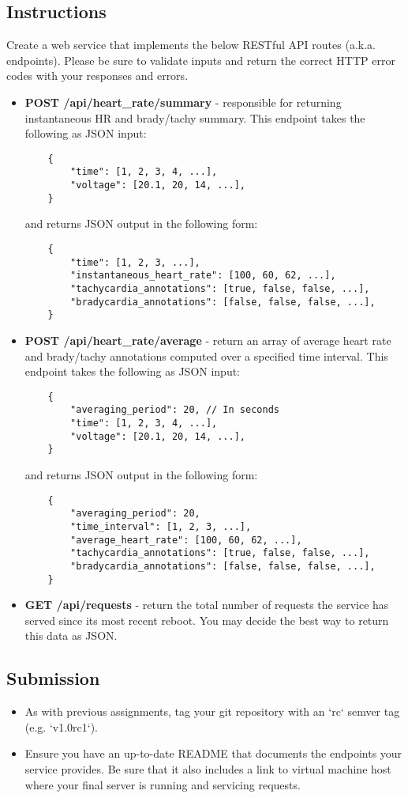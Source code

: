 \subsection*{Instructions}
Create a web service that implements the below RESTful API routes (a.k.a. endpoints). Please be sure to validate inputs and return the correct HTTP error codes with your responses and errors.
\begin{itemize}
	\item {\bf POST /api/heart\_rate/summary} - responsible for returning instantaneous HR and brady/tachy summary.
	This endpoint takes the following as JSON input:	
	\begin{lstlisting}
	{
		"time": [1, 2, 3, 4, ...],
		"voltage": [20.1, 20, 14, ...],
	}
	\end{lstlisting}
	and returns JSON output in the following form:
	\begin{lstlisting}
	{
		"time": [1, 2, 3, ...],
		"instantaneous_heart_rate": [100, 60, 62, ...],  
		"tachycardia_annotations": [true, false, false, ...],
		"bradycardia_annotations": [false, false, false, ...],
	}
	\end{lstlisting}

	\item {\bf POST /api/heart\_rate/average} - return an array of average heart rate and brady/tachy annotations computed over a specified time interval. 
	This endpoint takes the following as JSON input:	
	\begin{lstlisting}
	{
		"averaging_period": 20, // In seconds
		"time": [1, 2, 3, 4, ...],
		"voltage": [20.1, 20, 14, ...],
	}
	\end{lstlisting}
	and returns JSON output in the following form:
	\begin{lstlisting}
	{
		"averaging_period": 20,
		"time_interval": [1, 2, 3, ...],
		"average_heart_rate": [100, 60, 62, ...],  
		"tachycardia_annotations": [true, false, false, ...],
		"bradycardia_annotations": [false, false, false, ...],
	}
	\end{lstlisting}

	\item {\bf GET /api/requests} - return the total number of requests the service has served since its most recent reboot. You may decide the best way to return this data as JSON.
\end{itemize}

\subsection*{Submission}
\begin{itemize}
	\item As with previous assignments, tag your git repository with an `rc` semver tag (e.g. `v1.0rc1`).
	\item Ensure you have an up-to-date README that documents the endpoints your service provides. Be sure that it also includes a link to virtual machine host where your final server is running and servicing requests.
\end{itemize}

